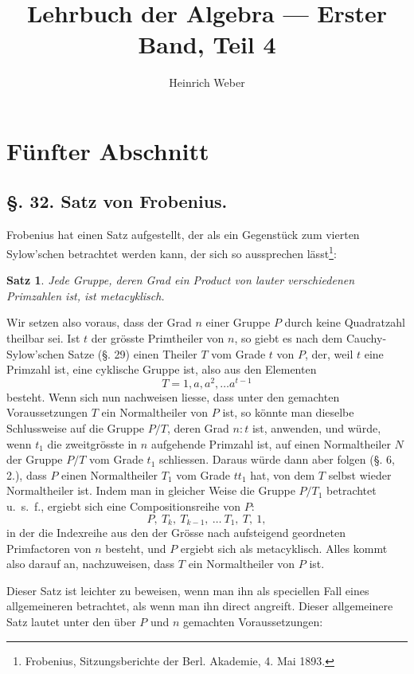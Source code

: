 \documentclass[12pt,a4paper]{article}
\title{Lehrbuch der Algebra --- Erster Band, Teil 4}
\author{Heinrich Weber}
\date{}
\theoremstyle{plain}
\newtheorem{satz}{Satz}[section]
\theoremstyle{definition}
\theoremstyle{remark}
\begin{document}
\maketitle

\section*{Fünfter Abschnitt}

\subsection*{\S. 32. Satz von Frobenius.}

Frobenius hat einen Satz aufgestellt, der als ein Gegenstück zum vierten Sylow'schen betrachtet werden kann, der sich so aussprechen lässt\footnote{Frobenius, Sitzungsberichte der Berl. Akademie, 4. Mai 1893.}:

\begin{satz}
Jede Gruppe, deren Grad ein Product von lauter verschiedenen Primzahlen ist, ist metacyklisch.
\end{satz}

Wir setzen also voraus, dass der Grad $n$ einer Gruppe $P$ durch keine Quadratzahl theilbar sei. Ist $t$ der grösste Primtheiler von $n$, so giebt es nach dem Cauchy-Sylow'schen Satze (\S. 29) einen Theiler $T$ vom Grade $t$ von $P$, der, weil $t$ eine Primzahl ist, eine cyklische Gruppe ist, also aus den Elementen
\[
T = 1, a, a^{2}, \ldots a^{t-1}
\]
besteht. Wenn sich nun nachweisen liesse, dass unter den gemachten Voraussetzungen $T$ ein Normaltheiler von $P$ ist, so könnte man dieselbe Schlussweise auf die Gruppe $P/T$, deren Grad $n:t$ ist, anwenden, und würde, wenn $t_{1}$ die zweitgrösste in $n$ aufgehende Primzahl ist, auf einen Normaltheiler $N$ der Gruppe $P/T$ vom Grade $t_{1}$ schliessen. Daraus würde dann aber folgen (\S. 6, 2.), dass $P$ einen Normaltheiler $T_{1}$ vom Grade $tt_{1}$ hat, von dem $T$ selbst wieder Normaltheiler ist. Indem man in gleicher Weise die Gruppe $P/T_{1}$ betrachtet u.~s.~f., ergiebt sich eine Compositionsreihe von $P$:
\[
P,\ T_{k},\ T_{k-1},\ \ldots\ T_{1},\ T,\ 1,
\]
in der die Indexreihe aus den der Grösse nach aufsteigend geordneten Primfactoren von $n$ besteht, und $P$ ergiebt sich als metacyklisch. Alles kommt also darauf an, nachzuweisen, dass $T$ ein Normaltheiler von $P$ ist.

Dieser Satz ist leichter zu beweisen, wenn man ihn als speciellen Fall eines allgemeineren betrachtet, als wenn man ihn direct angreift. Dieser allgemeinere Satz lautet unter den über $P$ und $n$ gemachten Voraussetzungen:
\end{document}

